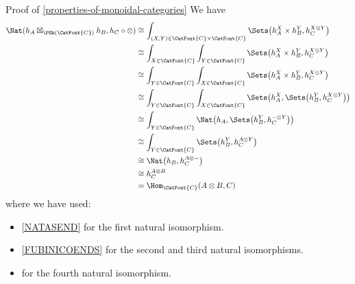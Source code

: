 \begin{Proof}{Proof of \cref{properties-of-monoidal-categories}}
    We have
    \begin{align*}
        \Nat(h_{A}\boxtimes_{\PSh(\CatFont{C})}h_{B},h_{C}\circ\mathord{\otimes}) &\cong \int_{(X,Y)\in\CatFont{C}\times\CatFont{C}}\Sets\big(h^{X}_{A}\times h^{Y}_{B},h^{X\otimes Y}_{C}\big)\\
                                                                                                &\cong \int_{X\in\CatFont{C}}\int_{Y\in\CatFont{C}}\Sets\big(h^{X}_{A}\times h^{Y}_{B},h^{X\otimes Y}_{C}\big)\\
                                                                                                &\cong \int_{Y\in\CatFont{C}}\int_{X\in\CatFont{C}}\Sets\big(h^{X}_{A}\times h^{Y}_{B},h^{X\otimes Y}_{C}\big)\\
                                                                                                &\cong \int_{Y\in\CatFont{C}}\int_{X\in\CatFont{C}}\Sets\big(h^{X}_{A},\Sets\big(h^{Y}_{B},h^{X\otimes Y}_{C}\big)\big)\\
                                                                                                &\cong \int_{Y\in\CatFont{C}}\Nat\big(h_{A},\Sets\big(h^{Y}_{B},h^{-\otimes Y}_{C}\big)\big)\\
                                                                                                &\cong \int_{Y\in\CatFont{C}}\Sets\big(h^{Y}_{B},h^{A\otimes Y}_{C}\big)\\
                                                                                                &\cong \Nat\big(h_{B},h^{A\otimes-}_{C}\big)\\
                                                                                                &\cong h^{A\otimes B}_{C}\\
                                                                                                &=     \Hom_{\CatFont{C}}(A\otimes B,C)
    \end{align*}
    where we have used:
    \begin{itemize}
        \item \cref{NATASEND}     for the first natural isomorphism.
        \item \cref{FUBINICOENDS} for the second and third natural isomorphisms.
        \item {} for the fourth natural isomorphism.

\end{itemize}
\end{Proof}
